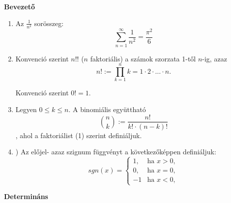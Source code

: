 \documentclass{article}
\begin{document}
\textbf{Bevezető}

\begin{enumerate}[label=(\alph*)]
	\item Az $\frac{1}{n^2}$ sorösszeg:
	\[ \sum_{n=1}^\infty \frac{1}{n^2} = \frac{\pi^2}{6} \]
	
	\item Konvenció szerint $\mathit{n!}$! ($\mathit{n}$ 				faktoriális) a számok szorzata 1-től $\mathit{n}$-ig, 		azaz
	\[ n! := \prod_{k=1}^n k = 1 \cdot 2 \cdot \ldots \cdot n. 			\] 
	
	Konvenció szerint $0! = 1$.
	
	\item Legyen $0 \leq k \leq n$. A binomiális együttható
	\[ \binom{n}{k} := \frac{n!}{k! \cdot (n-k)!} \],
	ahol a faktoriálist (1) szerint definiáljuk.
	
	\item ) Az előjel- azaz szignum függvényt a 					következőképpen definiáljuk:
	\[ sgn(x) = \begin{cases}
	1, & \text{ha } x > 0,\\
	0, & \text{ha } x = 0, \\
	-1 & \text{ha } x < 0, \end{cases} \]
	
\end{enumerate}

\textbf{Determináns}
\end{document}
